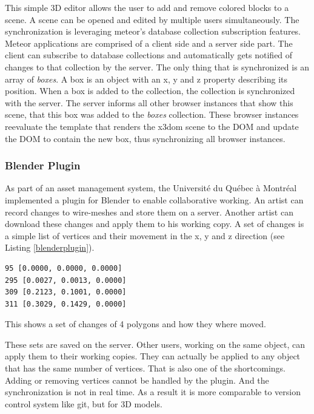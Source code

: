 This simple \gls{3D} editor allows the user to add and remove colored blocks to a
scene. A scene can be opened and edited by multiple users simultaneously. The synchronization is leveraging meteor's database collection
subscription features. Meteor applications are comprised of a client side and a
server side part. The client can subscribe to database collections and
automatically gets notified of changes to that collection by the server. The only
thing that is synchronized is an array of \emph{boxes}. A box is an
object with an x, y and z property describing its position. When a box is
added to the collection, the collection is synchronized with the server. The
server informs all other browser instances that show this scene, that this box was added to the \emph{boxes} collection.
These browser instances reevaluate the template that renders the x3dom scene to
the \gls{DOM} and update the \gls{DOM} to contain the new box, thus synchronizing
all browser instances. \cite{3dmeteor}

\subsubsection{Blender Plugin}
\label{blender-plugin}

As part of an asset management system, the Université du Québec à
Montréal implemented a plugin for Blender to enable collaborative working. An
artist can record changes to wire-meshes and store them on a server.
Another artist can download these changes and apply them to his working
copy. A set of changes is a simple list of vertices and their movement in the
x, y and z direction (see Listing \ref{blenderplugin}). \cite{LCR07}

\begin{listing}
  \begin{verbatim}
95 [0.0000, 0.0000, 0.0000]
295 [0.0027, 0.0013, 0.0000]
309 [0.2123, 0.1001, 0.0000]
311 [0.3029, 0.1429, 0.0000]
  \end{verbatim}
  \caption{This shows a set of changes of 4 polygons and how they where moved.}
  \label{blenderplugin}
\end{listing}

These sets are saved on the server. Other users, working on the same
object, can apply them to their working copies. They can actually be applied
to any object that has the same number of vertices. That is also one of the
shortcomings. Adding or removing vertices cannot be handled by the
plugin. And the synchronization is not in real time. As a result it is more comparable to version
control system like \gls{git}, but for \gls{3D} models.

